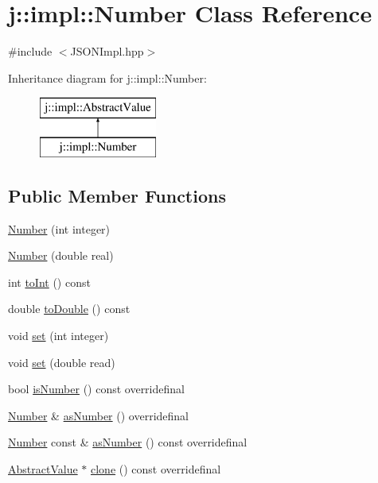 \hypertarget{classj_1_1impl_1_1_number}{\section{j\-:\-:impl\-:\-:Number Class Reference}
\label{classj_1_1impl_1_1_number}
}


{\ttfamily \#include $<$J\-S\-O\-N\-Impl.\-hpp$>$}

Inheritance diagram for j\-:\-:impl\-:\-:Number\-:\begin{figure}[H]
\begin{center}
\leavevmode
\includegraphics[height=2.000000cm]{classj_1_1impl_1_1_number}
\end{center}
\end{figure}
\subsection*{Public Member Functions}
\begin{DoxyCompactItemize}
\item 
\hyperlink{classj_1_1impl_1_1_number_a7a2374239a92ecb7e9c923ec675c46d1}{Number} (int integer)
\item 
\hyperlink{classj_1_1impl_1_1_number_a3d0ddcf35f9fafa40d92d353d8761f7c}{Number} (double real)
\item 
int \hyperlink{classj_1_1impl_1_1_number_a8f6a1bdd70886f790e2a3f285a96dd28}{to\-Int} () const 
\item 
double \hyperlink{classj_1_1impl_1_1_number_a434fd32607b9dd080e6c9ec26df6581f}{to\-Double} () const 
\item 
void \hyperlink{classj_1_1impl_1_1_number_af3b0824e2f419f9104c11a59f94914ee}{set} (int integer)
\item 
void \hyperlink{classj_1_1impl_1_1_number_a0ecf794de3e1b99548b8e094e0576297}{set} (double read)
\item 
bool \hyperlink{classj_1_1impl_1_1_number_a90888fbf7797a69fae21d3f6ad68fc84}{is\-Number} () const overridefinal
\item 
\hyperlink{classj_1_1impl_1_1_number}{Number} \& \hyperlink{classj_1_1impl_1_1_number_a86cf66c468eb3b75072bd431d8637529}{as\-Number} () overridefinal
\item 
\hyperlink{classj_1_1impl_1_1_number}{Number} const \& \hyperlink{classj_1_1impl_1_1_number_af72a6b872008d58ecd80547c89d9d355}{as\-Number} () const overridefinal
\item 
\hyperlink{classj_1_1impl_1_1_abstract_value}{Abstract\-Value} $\ast$ \hyperlink{classj_1_1impl_1_1_number_a4b48134b69e2fa6397477b1bd8334f68}{clone} () const overridefinal
\end{DoxyCompactItemize}
